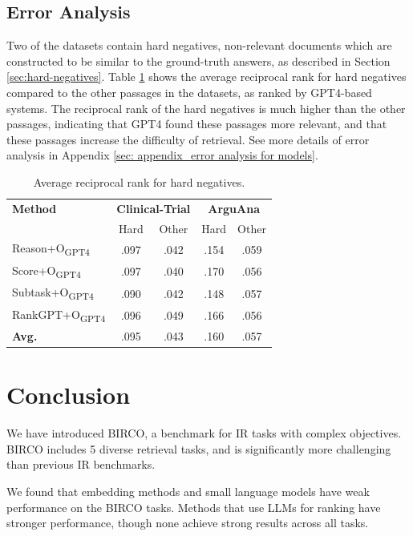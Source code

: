 \documentclass[11pt]{article}
\begin{document}
\subsection{Error Analysis}
Two of the datasets contain hard negatives, non-relevant documents which are constructed to be similar to the ground-truth answers, as described in Section \ref{sec:hard-negatives}. Table \ref{tab: compact_arr} shows the average reciprocal rank for hard negatives compared to the other passages in the datasets, as ranked by GPT4-based systems. The reciprocal rank of the hard negatives is much higher than the other passages, indicating that GPT4 found these passages more relevant, and that these passages increase the difficulty of retrieval. See more details of error analysis in Appendix \ref{sec: appendix_error analysis for models}.
\begin{table}[ht]
\centering
\setlength{\tabcolsep}{1.5pt}
\begin{tabular}{lcc|cc}
\toprule
\textbf{Method} & \multicolumn{2}{c|}{\textbf{Clinical-Trial}} & \multicolumn{2}{c}{\textbf{ArguAna}} \\
 & Hard & Other & Hard & Other \\
\midrule
Reason+O\textsubscript{\scriptsize{GPT4}} & .097 & .042 & .154 & .059 \\
Score+O\textsubscript{\scriptsize{GPT4}} & .097 & .040 & .170 & .056 \\
Subtask+O\textsubscript{\scriptsize{GPT4}} & .090 & .042 & .148 & .057 \\
RankGPT+O\textsubscript{\scriptsize{GPT4}} & .096 & .049 & .166 & .056 \\
\midrule
\textbf{Avg.} & .095 & .043 & .160 & .057 \\
\bottomrule
\end{tabular}

\caption{Average reciprocal rank for hard negatives. }
\label{tab: compact_arr}
\end{table}


\section{Conclusion}

We have introduced BIRCO, a benchmark for IR tasks with complex objectives. BIRCO includes 5 diverse retrieval tasks, and is significantly more challenging than previous IR benchmarks.

We found that embedding methods and small language models have weak performance on the BIRCO tasks. Methods that use LLMs for ranking have stronger performance, though none achieve strong results across all tasks.
\end{document}
